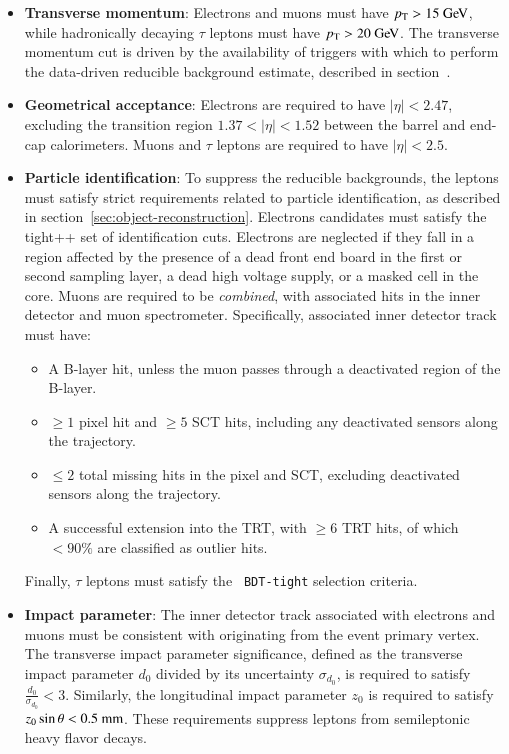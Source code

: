 \begin{itemize}

	\item \textbf{Transverse momentum}: Electrons and muons must have $\pt>15 \GeV$, while hadronically decaying $\tau$ leptons must have $\pt>20 \GeV$. The transverse momentum cut is driven by the availability of triggers with which to perform the data-driven reducible background estimate, described in section~\label{sec:fake-factors}. 

	\item \textbf{Geometrical acceptance}: Electrons are required to have $|\eta|<2.47$, excluding the transition region $1.37<|\eta|<1.52$ between the barrel and end-cap calorimeters. Muons and $\tau$ leptons are required to have $|\eta|<2.5$.

	\item \textbf{Particle identification}: To suppress the reducible backgrounds, the leptons must satisfy strict requirements related to particle identification, as described in section~\ref{sec:object-reconstruction}. Electrons candidates must satisfy the tight++ set of identification cuts. Electrons are neglected if they fall in a region affected by the presence of a dead front end board in the first or second sampling layer, a dead high voltage supply, or a masked cell in the core. Muons are required to be \emph{combined}, with associated hits in the inner detector and muon spectrometer. Specifically, associated inner detector track must have:
	\begin{itemize}
	  \item A B-layer hit, unless the muon passes through a deactivated region of the B-layer.
	  \item $\geq1$ pixel hit and $\geq5$ SCT hits, including any deactivated sensors along the trajectory.
	  \item $\leq2$ total missing hits in the pixel and SCT, excluding deactivated sensors along the trajectory. 
	  \item A successful extension into the TRT, with $\geq6$ TRT hits, of which $<90\%$ are classified as outlier hits.
	\end{itemize}

	Finally, $\tau$ leptons must satisfy the \texttt{ BDT-tight} selection criteria.

	\item \textbf{Impact parameter}: The inner detector track associated with electrons and muons must be consistent with originating from the event primary vertex. The transverse impact parameter significance, defined as the transverse impact parameter $d_0$ divided by its uncertainty $\sigma_{d_0}$, is required to satisfy $\frac{d_0}{\sigma_{d_0}}<3$. Similarly, the longitudinal impact parameter $z_0$ is required to satisfy $z_0\sin\theta < 0.5~\mathrm{mm}$. These requirements suppress leptons from semileptonic heavy flavor decays. 


\end{itemize}

